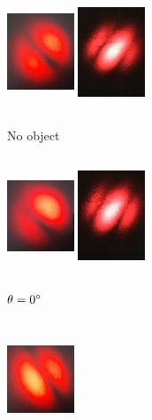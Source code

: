 \documentclass[12pt]{book}
\begin{document}
\begin{figure}[H]
\centering
\begin{subfigure}[b]{0.3\linewidth}
\centering
\includegraphics[width=2cm,height=3.5cm]{images/fotos/11.jpg}
\includegraphics[width=2cm,height=3.5cm]{images/fotos/112.jpg}
\caption{No object}
\end{subfigure}
\begin{subfigure}[b]{0.3\linewidth}
\centering
\includegraphics[width=2cm,height=3.5cm]{images/fotos/21.jpg}
\includegraphics[width=2cm,height=3.5cm]{images/fotos/102.jpg}
\caption{$\theta=0\degree$}
\end{subfigure}
\begin{subfigure}[b]{0.3\linewidth}
\centering
\includegraphics[width=2cm,height=3.5cm]{images/fotos/31.jpg}

\end{subfigure}
\end{figure}
\end{document}

